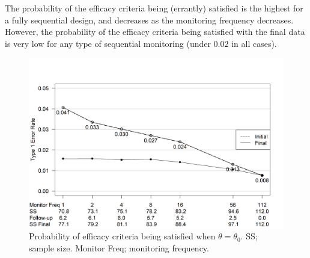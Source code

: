 \documentclass[12pt]{article}
\begin{document}
The probability of the efficacy criteria being (errantly) satisfied is the highest for a fully sequential design, and decreases as the monitoring frequency decreases. However, the probability of the efficacy criteria being satisfied with the final data is very low for any type of sequential monitoring (under 0.02 in all cases).
\begin{figure}\begin{center}

    \includegraphics[width=6in]{./FIGURES/figure4.png}
    \caption{Probability of efficacy criteria being satisfied when $\theta=\theta_0$. SS; sample size. Monitor Freq; monitoring frequency.}
	\label{fig:ex1t1e}

 
\end{center}\end{figure}
\end{document}
